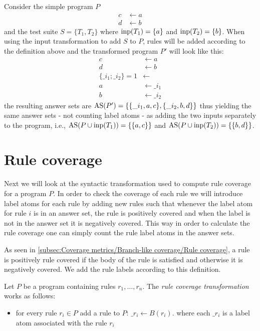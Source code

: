 \begin{example}
\label{ex:input transformation}
    Consider the simple program $P$
    \begin{align*}
        c &\leftarrow a \\
        d &\leftarrow b
    \end{align*}
    and the test suite \(S = \{T_1, T_2\}\) where \(\operatorname{inp}(T_1) = \{a\}\) and \(\operatorname{inp}(T_2) = \{b\}\). When using the input transformation to add $S$ to $P$, rules will be added according to the definition above and the transformed program $P'$ will look like this:
    \begin{align*}
        c &\leftarrow a \\
        d &\leftarrow b \\
        \{\_i_1; \_i_2\} = 1 &\leftarrow \\
        a &\leftarrow \_i_1 \\
        b &\leftarrow \_i_2
    \end{align*}
    the resulting answer sets are \(\operatorname{AS}(P') = \{\{\_i_1, a, c\}, \{\_i_2, b, d\}\}\) thus yielding the same answer sets - not counting label atoms - as adding the two inputs separately to the program, i.e., \(\operatorname{AS}(P \cup \operatorname{inp}(T_1)) = \{\{a, c\}\}\) and \(\operatorname{AS}(P \cup \operatorname{inp}(T_2)) = \{\{b, d\}\}\).
\end{example}

\section{Rule coverage}
\label{sec:Computing coverage metrics for propositional programs/Rule coverage}
Next we will look at the syntactic transformation used to compute rule coverage for a program $P$. In order to check the coverage of each rule we will introduce label atoms for each rule by adding new rules such that whenever the label atom for rule $i$ is in an answer set, the rule is positively covered and when the label is not in the answer set it is negatively covered. This way in order to calculate the rule coverage one can simply count the rule label atoms in the answer sets.

As seen in \cref{subsec:Coverage metrics/Branch-like coverage/Rule coverage}, a rule is positively rule covered if the body of the rule is satisfied and otherwise it is negatively covered. We add the rule labels according to this definition.

\begin{definition}
\label{def:rule transformation}
    Let $P$ be a program containing rules \(r_1, \ldots, r_n\). The \emph{rule coverage transformation} works as follows:
    \begin{itemize}
        \item for every rule \(r_i \in P\) add a rule to $P$: \(\_r_i \leftarrow B(r_i).\) where each $\_r_i$ is a label atom associated with the rule $r_i$
    \end{itemize}
\end{definition}


